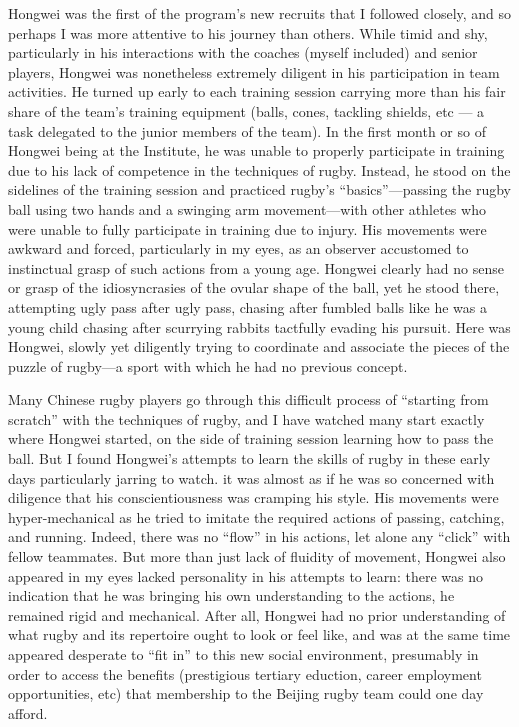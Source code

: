 Hongwei was the first of the program’s new recruits that I followed closely, and so perhaps I was more attentive to his journey than others.  While timid and shy, particularly in his interactions with the coaches (myself included) and senior players, Hongwei was nonetheless extremely diligent in his participation in team activities.  He turned up early to each training session carrying more than his fair share of the team’s training equipment (balls, cones, tackling shields, etc — a task delegated to the junior members of the team).  In the first month or so of Hongwei being at the Institute, he was unable to properly participate in training due to his lack of competence in the techniques of rugby.  Instead, he stood on the sidelines of the training session and practiced rugby's ``basics''—passing the rugby ball using two hands and a swinging arm movement—with other athletes who were unable to fully participate in training due to injury.  His movements were awkward and forced, particularly in my eyes, as an observer accustomed to instinctual grasp of such actions from a young age.  Hongwei clearly had no sense or grasp of the idiosyncrasies of the ovular shape of the ball, yet he stood there, attempting ugly pass after ugly pass, chasing after fumbled balls like he was a young child chasing after scurrying rabbits tactfully evading his pursuit.  Here was Hongwei, slowly yet diligently trying to coordinate and associate the pieces of the puzzle of rugby—a sport with which he had no previous concept.

Many Chinese rugby players go through this difficult process of ``starting from scratch'' with the techniques of rugby, and I have watched many start exactly where Hongwei started, on the side of training session learning how to pass the ball.  But I found Hongwei’s attempts to learn the skills of rugby in these early days particularly jarring to watch.  it was almost as if he was so concerned with diligence that his conscientiousness was cramping his style. His movements were hyper-mechanical as he tried to imitate the required actions of passing, catching, and running.  Indeed, there was no ``flow'' in his actions, let alone any ``click'' with fellow teammates.  But more than just lack of fluidity of movement, Hongwei also appeared in my eyes lacked personality in his attempts to learn: there was no indication that he was bringing his own understanding to the actions, he remained rigid and mechanical.  After all, Hongwei had no prior understanding of what rugby and its repertoire ought to look or feel like, and was at the same time appeared desperate to ``fit in'' to this new social environment, presumably in order to access the benefits (prestigious tertiary eduction, career employment opportunities, etc) that membership to the Beijing rugby team could one day afford.


